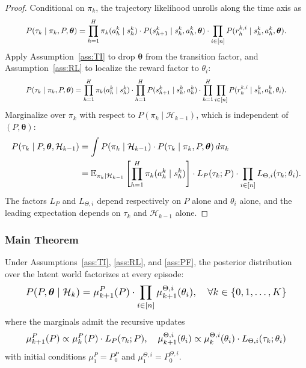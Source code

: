 \begin{proof}
Conditional on $\pi_k$, the trajectory likelihood unrolls along the time axis as
\begin{equation}\resizebox{0.9\linewidth}{!}{$\displaystyle P(\tau_k \mid \pi_k, P, \boldsymbol{\theta}) = \prod_{h=1}^H \pi_k(a_h^k \mid s_h^k) \cdot P(s_{h+1}^k \mid s_h^k, a_h^k, \boldsymbol{\theta}) \cdot \prod_{i \in [n]} P(r_h^{k,i} \mid s_h^k, a_h^k, \boldsymbol{\theta}). $}\end{equation}
Apply Assumption~\ref{ass:TI} to drop $\boldsymbol{\theta}$ from the transition factor, and Assumption~\ref{ass:RL} to localize the reward factor to $\theta_i$:
\begin{equation}\resizebox{0.9\linewidth}{!}{$\displaystyle P(\tau_k \mid \pi_k, P, \boldsymbol{\theta}) = \prod_{h=1}^H \pi_k(a_h^k \mid s_h^k) \cdot \prod_{h=1}^H P(s_{h+1}^k \mid s_h^k, a_h^k) \cdot \prod_{h=1}^H \prod_{i \in [n]} P(r_h^{k,i} \mid s_h^k, a_h^k, \theta_i). $}\end{equation}
Marginalize over $\pi_k$ with respect to $P(\pi_k \mid \mathcal{H}_{k-1})$, which is independent of $(P, \boldsymbol{\theta})$:
\[\resizebox{\linewidth}{!}{$\displaystyle\begin{aligned}
P(\tau_k \mid P, \boldsymbol{\theta}, \mathcal{H}_{k-1}) &= \int P(\pi_k \mid \mathcal{H}_{k-1}) \cdot P(\tau_k \mid \pi_k, P, \boldsymbol{\theta}) \, d\pi_k \\
&= \mathbb{E}_{\pi_k \mid \mathcal{H}_{k-1}}\left[\prod_{h=1}^H \pi_k(a_h^k \mid s_h^k)\right] \cdot L_P(\tau_k; P) \cdot \prod_{i \in [n]} L_{\Theta,i}(\tau_k; \theta_i).
\end{aligned}$}\]
The factors $L_P$ and $L_{\Theta,i}$ depend respectively on $P$ alone and $\theta_i$ alone, and the leading expectation depends on $\tau_k$ and $\mathcal{H}_{k-1}$ alone.
\end{proof}

\subsubsection{Main Theorem}

\begin{theorem}
\label{thm:decoupling-app}
Under Assumptions~\ref{ass:TI}, \ref{ass:RL}, and \ref{ass:PF}, the posterior distribution over the latent world factorizes at every episode:
\begin{equation}\label{eq:decoupling-app}\resizebox{0.9\linewidth}{!}{$\displaystyle P(P, \boldsymbol{\theta} \mid \mathcal{H}_k) = \mu_{k+1}^P(P) \cdot \prod_{i \in [n]} \mu_{k+1}^{\Theta,i}(\theta_i), \quad \forall k \in \{0, 1, \ldots, K\} $}\end{equation}
where the marginals admit the recursive updates
\begin{equation}\resizebox{0.9\linewidth}{!}{$\displaystyle \mu_{k+1}^P(P) \propto \mu_k^P(P) \cdot L_P(\tau_k; P), \quad \mu_{k+1}^{\Theta,i}(\theta_i) \propto \mu_k^{\Theta,i}(\theta_i) \cdot L_{\Theta,i}(\tau_k; \theta_i) $}\end{equation}
with initial conditions $\mu_1^P = P_0^P$ and $\mu_1^{\Theta,i} = P_0^{\Theta,i}$.
\end{theorem}

